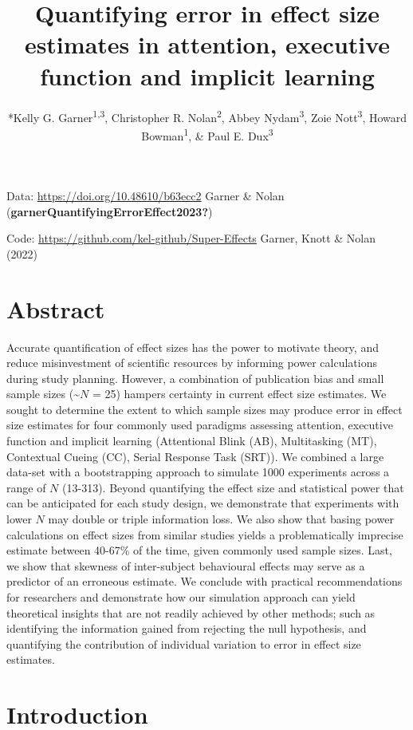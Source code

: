 \documentclass[
  man]{apa6}
\title{Quantifying error in effect size estimates in attention, executive function and implicit learning}
\author{*Kelly G. Garner\textsuperscript{1,3}, Christopher R. Nolan\textsuperscript{2}, Abbey Nydam\textsuperscript{3}, Zoie Nott\textsuperscript{3}, Howard Bowman\textsuperscript{1}, \& Paul E. Dux\textsuperscript{3}}
\date{}
\affiliation{\vspace{0.5cm}\textsuperscript{1} School of Psychology, University of Birmingham, UK\\\textsuperscript{2} School of Psychology, University of New South Wales, Australia\\\textsuperscript{3} School of Psychology, The University of Queensland, Australia}
\begin{document}
\maketitle

Data: \url{https://doi.org/10.48610/b63ecc2} Garner \& Nolan (\textbf{garnerQuantifyingErrorEffect2023?})

Code: \url{https://github.com/kel-github/Super-Effects} Garner, Knott \& Nolan (2022)

\clearpage

\hypertarget{abstract}{%
\section{Abstract}\label{abstract}}

Accurate quantification of effect sizes has the power to motivate theory, and reduce misinvestment of scientific resources by informing power calculations during study planning. However, a combination of publication bias and small sample sizes (\textasciitilde{}\(N\) = 25) hampers certainty in current effect size estimates. We sought to determine the extent to which sample sizes may produce error in effect size estimates for four commonly used paradigms assessing attention, executive function and implicit learning (Attentional Blink (AB), Multitasking (MT), Contextual Cueing (CC), Serial Response Task (SRT)). We combined a large data-set with a bootstrapping approach to simulate 1000 experiments across a range of \(N\) (13-313). Beyond quantifying the effect size and statistical power that can be anticipated for each study design, we demonstrate that experiments with lower \(N\) may double or triple information loss. We also show that basing power calculations on effect sizes from similar studies yields a problematically imprecise estimate between 40-67\% of the time, given commonly used sample sizes. Last, we show that skewness of inter-subject behavioural effects may serve as a predictor of an erroneous estimate. We conclude with practical recommendations for researchers and demonstrate how our simulation approach can yield theoretical insights that are not readily achieved by other methods; such as identifying the information gained from rejecting the null hypothesis, and quantifying the contribution of individual variation to error in effect size estimates.

\clearpage

\hypertarget{introduction}{%
\section{Introduction}\label{introduction}}
\end{document}
